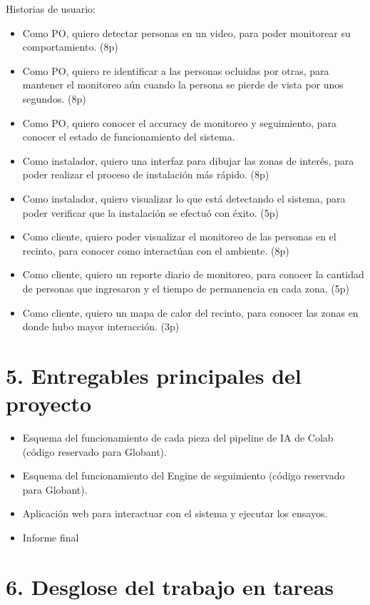 \documentclass[11pt]{charter}
\begin{document}
Historias de usuario:
\begin{itemize}
\item Como PO, quiero detectar personas en un video, para poder monitorear su comportamiento. (8p)
\item Como PO, quiero re identificar a las personas ocluidas por otras, para mantener el monitoreo aún cuando la persona se pierde de vista por unos segundos. (8p)
\item Como PO, quiero conocer el accuracy de monitoreo y seguimiento, para conocer el estado de funcionamiento del sistema.
\item Como instalador, quiero una interfaz para dibujar las zonas de interés, para poder realizar el proceso de instalación más rápido. (8p)
\item Como instalador, quiero visualizar lo que está detectando el sistema, para poder verificar que la instalación se efectuó con éxito. (5p)
\item Como cliente, quiero poder visualizar el monitoreo de las personas en el recinto, para conocer como interactúan con el ambiente. (8p)
\item Como cliente, quiero un reporte diario de monitoreo, para conocer la cantidad de personas que ingresaron y el tiempo de permanencia en cada zona. (5p)
\item Como cliente, quiero un mapa de calor del recinto, para conocer las zonas en donde hubo mayor interacción. (3p)
\end{itemize}

\newpage

\section{5. Entregables principales del proyecto}
\label{sec:entregables}

\begin{itemize}
\item Esquema del funcionamiento de cada pieza del pipeline de IA de Colab (código reservado para Globant).
\item Esquema del funcionamiento del Engine de seguimiento (código reservado para Globant).
\item Aplicación web para interactuar con el sistema y ejecutar los ensayos.
\item Informe final
\end{itemize}

\section{6. Desglose del trabajo en tareas}
\label{sec:wbs}
\end{document}
